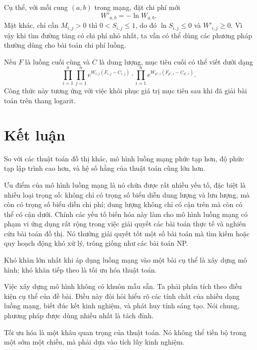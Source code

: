 \documentclass[11pt]{article}
\begin{document}
Cụ thể, với mỗi cung \((a,b)\) trong mạng, đặt chi phí mới
\[
  W'_{a,b}=-\ln W_{a,b}.
\]
Mặt khác, chỉ cần \(M_{i,j}>0\) thì \(0<S_{i,j}\le 1\), do đó
\(\ln S_{i,j}\le 0\) và \(W'_{i,j}\ge 0\). Vì vậy khi tìm đường tăng có chi
phí nhỏ nhất, ta vẫn có thể dùng các phương pháp thường dùng cho bài toán
chi phí luồng.

Nếu \(F\) là luồng cuối cùng và \(C\) là dung lượng, mục tiêu cuối có thể
viết dưới dạng
\[
  \prod_{i=1}^{n}\prod_{j=1}^{n}
    e^{W_{i,j}(F_{i,j}-C_{i,j})}
  \cdot
  \prod_{i=1}^{n}
    e^{W_{p',i}(F_{p',i}-C_{p',i})}.
\]
Công thức này tương ứng với việc khôi phục giá trị mục tiêu sau khi đã giải
bài toán trên thang logarit.

\section{Kết luận}

So với các thuật toán đồ thị khác, mô hình luồng mạng phức tạp hơn, độ phức
tạp lập trình cao hơn, và hệ số hằng của thuật toán cũng lớn hơn.

Ưu điểm của mô hình luồng mạng là nó chứa được rất nhiều yếu tố, đặc biệt là
nhiều loại trọng số: không chỉ có trọng số biểu diễn dung lượng và lưu lượng,
mà còn có trọng số biểu diễn chi phí; dung lượng không chỉ có cận trên mà còn
có thể có cận dưới. Chính các yếu tố biến hóa này làm cho mô hình luồng mạng
có phạm vi ứng dụng rất rộng trong việc giải quyết các bài toán thực tế và
nghiên cứu bài toán đồ thị. Nó thường giải quyết tốt một số bài toán mà tìm
kiếm hoặc quy hoạch động khó xử lý, trông giống như các bài toán NP.

Khó khăn lớn nhất khi áp dụng luồng mạng vào một bài cụ thể là xây dựng mô
hình; khó khăn tiếp theo là tối ưu hóa thuật toán.

Việc xây dựng mô hình không có khuôn mẫu sẵn. Ta phải phân tích theo điều
kiện cụ thể của đề bài. Điều này đòi hỏi hiểu rõ các tính chất của nhiều dạng
luồng mạng, biết đúc kết kinh nghiệm, và phát huy tính sáng tạo. Nói chung,
phương pháp được dùng nhiều nhất là tách đỉnh.

Tối ưu hóa là một khâu quan trọng của thuật toán. Nó không thể tiến bộ trong
một sớm một chiều, mà phải dựa vào tích lũy kinh nghiệm.
\end{document}
